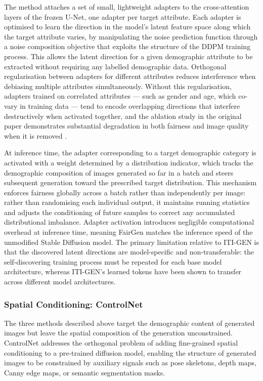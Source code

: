 The method attaches a set of small, lightweight adapters to the 
cross-attention layers of the frozen U-Net, one adapter per target 
attribute. Each adapter is optimised to learn the direction in the 
model's latent feature space along which the target attribute varies, 
by manipulating the noise prediction function through a noise 
composition objective that exploits the structure of the DDPM 
training process. This allows the latent direction for a given 
demographic attribute to be extracted without requiring any 
labelled demographic data. Orthogonal regularisation between 
adapters for different attributes reduces interference when 
debiasing multiple attributes simultaneously. Without this 
regularisation, adapters trained on correlated attributes — such as 
gender and age, which co-vary in training data — tend to encode 
overlapping directions that interfere destructively when activated 
together, and the ablation study in the original paper demonstrates 
substantial degradation in both fairness and image quality when it 
is removed \cite{Jiang_2025_FairGen}.

At inference time, the adapter corresponding to a target demographic 
category is activated with a weight determined by a distribution 
indicator, which tracks the demographic composition of images 
generated so far in a batch and steers subsequent generation toward 
the prescribed target distribution. This mechanism enforces fairness 
globally across a batch rather than independently per image: rather 
than randomising each individual output, it maintains running 
statistics and adjusts the conditioning of future samples to correct 
any accumulated distributional imbalance. Adapter activation 
introduces negligible computational overhead at inference time, 
meaning FairGen matches the inference speed of the unmodified Stable 
Diffusion model. The primary limitation relative to ITI-GEN is that 
the discovered latent directions are model-specific and 
non-transferable: the self-discovering training process must be 
repeated for each base model architecture, whereas ITI-GEN's learned 
tokens have been shown to transfer across different model 
architectures.

\subsubsection*{Spatial Conditioning: ControlNet}

The three methods described above target the demographic content of 
generated images but leave the spatial composition of the generation 
unconstrained. ControlNet \cite{LZhang_2023_ControlNet} addresses 
the orthogonal problem of adding fine-grained spatial conditioning 
to a pre-trained diffusion model, enabling the structure of generated 
images to be constrained by auxiliary signals such as pose skeletons, 
depth maps, Canny edge maps, or semantic segmentation masks.

